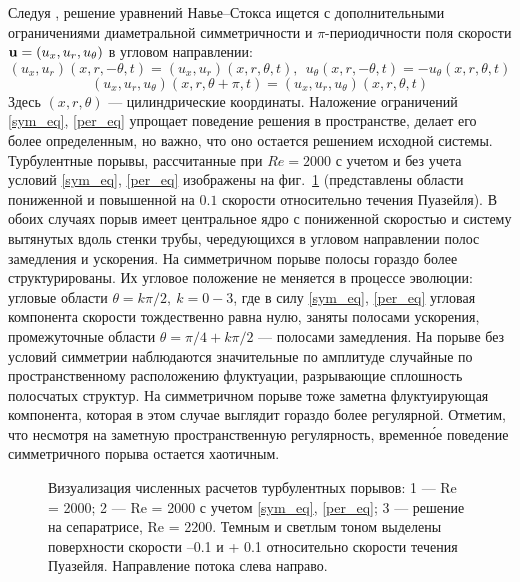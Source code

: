Следуя \cite{avila2013streamwise}, решение уравнений Навье--Стокса ищется с дополнительными ограничениями диаметральной симметричности и $\pi$-периодичности поля скорости $\mathbf{u}=(u_x,u_r,u_\theta)$ в угловом направлении:
\begin{equation}\label{sym_eq}
(u_x,u_r)(x,r,-\theta,t)=(u_x,u_r)(x,r,\theta,t),\ \ u_\theta(x,r,-\theta,t)=-u_\theta(x,r,\theta,t)
\end{equation}
\begin{equation}\label{per_eq}
(u_x,u_r,u_\theta)(x,r,\theta+\pi,t) = (u_x,u_r,u_\theta)(x,r,\theta,t)
\end{equation}
Здесь $(x,r,\theta)$ --- цилиндрические координаты. Наложение ограничений \eqref{sym_eq}, \eqref{per_eq} упрощает поведение решения в пространстве, делает его более определенным, но важно, что оно остается решением исходной системы. Турбулентные порывы, рассчитанные при $Re=2000$ с учетом и без учета условий \eqref{sym_eq}, \eqref{per_eq} изображены на фиг.~\ref{3D_img} (представлены области пониженной и повышенной на $0.1$ скорости относительно течения Пуазейля). В обоих случаях порыв имеет центральное ядро с пониженной скоростью и систему вытянутых вдоль стенки трубы, чередующихся в угловом направлении полос замедления и ускорения. На симметричном порыве полосы гораздо более структурированы. Их угловое положение не меняется в процессе эволюции: угловые области $\theta=k\pi/2,\ k=0-3$, где в силу \eqref{sym_eq}, \eqref{per_eq} угловая компонента скорости тождественно равна нулю, заняты полосами ускорения, промежуточные области $\theta=\pi/4+k\pi/2$ --- полосами замедления. На порыве без условий симметрии наблюдаются значительные по амплитуде случайные по пространственному расположению флуктуации, разрывающие сплошность полосчатых структур. На симметричном порыве тоже заметна флуктуирующая компонента, которая в этом случае выглядит гораздо более регулярной. Отметим, что несмотря на заметную пространственную регулярность, временн\'{о}е поведение симметричного порыва остается хаотичным.


\begin{figure}[h]
\caption{Визуализация численных расчетов турбулентных порывов: 1 --- Re = 2000; 2 --- Re = 2000 с учетом \eqref{sym_eq}, \eqref{per_eq}; 3 --- решение на сепаратрисе, Re = 2200. Темным и светлым тоном выделены поверхности скорости –0.1 и + 0.1 относительно скорости течения Пуазейля. Направление потока слева направо.}
\label{3D_img}
\end{figure}


